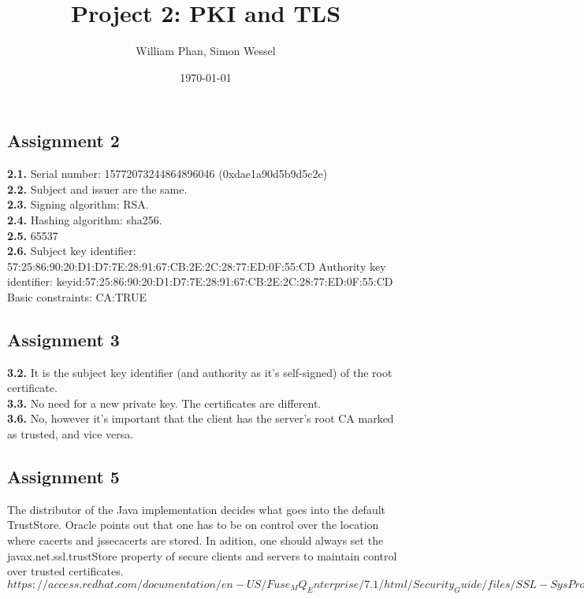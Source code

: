 \documentclass[11pt,a4paper]{article}
\title{Project 2: PKI and TLS} %
\author{William Phan, Simon Wessel}
\date{\today} %
\begin{document}
\maketitle %

\setcounter{secnumdepth}{0}

\subsection{Assignment 2}
\textbf{2.1.} Serial number: 15772073244864896046 (0xdae1a90d5b9d5c2e)\\
\textbf{2.2.} Subject and issuer are the same.\\
\textbf{2.3.} Signing algorithm: RSA.\\
\textbf{2.4.} Hashing algorithm: sha256.\\
\textbf{2.5.} 65537\\
\textbf{2.6.} Subject key identifier:
     57:25:86:90:20:D1:D7:7E:28:91:67:CB:2E:2C:28:77:ED:0F:55:CD\newline
     \indent Authority key identifier:
     keyid:57:25:86:90:20:D1:D7:7E:28:91:67:CB:2E:2C:28:77:ED:0F:55:CD\\
     Basic constraints:
     CA:TRUE
     
\subsection{Assignment 3}
\textbf{3.2.} It is the subject key identifier (and authority as it's self-signed) of the root certificate.\\
\textbf{3.3.} No need for a new private key. The certificates are different.\\
\textbf{3.6.} No, however it's important that the client has the server's root CA marked as trusted, and vice versa.

\subsection{Assignment 5}
The distributor of the Java implementation decides what goes into the default TrustStore. Oracle points out that one has to be on control over the location where cacerts and jssecacerts are stored. In adition, one should always set the javax.net.ssl.trustStore property of secure clients and servers to maintain control over trusted certificates.
\\{\scriptsize$https://access.redhat.com/documentation/en-US/Fuse_MQ_Enterprise/7.1/html/Security_Guide/files/SSL-SysProps.html$}
\end{document}
